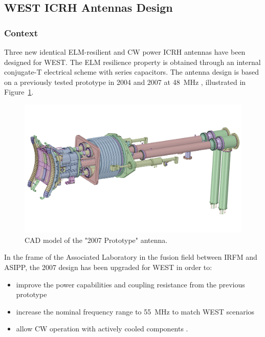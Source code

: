 \subsection{WEST ICRH Antennas Design}

\subsubsection{Context}
Three new identical ELM-resilient and CW power ICRH antennas have been designed for WEST. The ELM resilience property is obtained through an internal conjugate-T electrical scheme with series capacitors. The antenna design is based on a previously tested prototype in 2004 and 2007 at 48~MHz , illustrated in Figure~\ref{fig:proto2007antenna}. 

\begin{figure}[h]
	\centering
	\includegraphics[width=1.0\linewidth]{figures/chap3/WEST_ICRH/proto2007_antenna}
	\caption{CAD model of the "2007 Prototype" antenna.}
	\label{fig:proto2007antenna}
\end{figure}

In the frame of the Associated Laboratory in the fusion field between IRFM and ASIPP, the 2007 design has been upgraded for WEST in order to: 
\begin{itemize}
	\item improve the power capabilities and coupling resistance from the previous prototype   
	\item increase the nominal frequency range to 55~MHz to match WEST scenarios
	\item allow CW operation with actively cooled components .
\end{itemize} 


